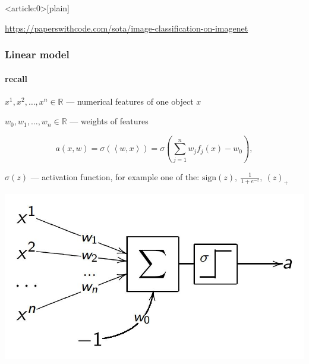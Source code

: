 \documentclass[fullscreen=true, bookmarks=true, hyperref={pdfencoding=unicode}]{beamer}
\begin{document}
{ %
    \begin{frame}<article:0>[plain]
        
        \vspace{8cm}
        \href{https://paperswithcode.com/sota/image-classification-on-imagenet}{https://paperswithcode.com/sota/image-classification-on-imagenet}
     \end{frame}
}


\begin{frame}
  \frametitle{Linear model}
  \framesubtitle{recall}

 $x^1, x^2, \dots, x^n \in \mathbb{R}$ — numerical features of one object $x$
 
 $w_0, w_1, \dots, w_n \in \mathbb{R}$ — weights of features
 
 $$a(x, w) = \sigma(\left<w, x\right>) = \sigma \left(\sum\limits_{j=1}^n w_j f_j(x) - w_0 \right),$$
 
 $\sigma(z)$ — activation function, for example one of the:
 $\text{sign}(z),\ \frac{1}{1+e^{-z}},\ (z)_+$

\begin{center}
  \includegraphics[keepaspectratio, width=.5\paperwidth]{lin_as_nn.jpg}
\end{center}
\end{frame}
\end{document}
